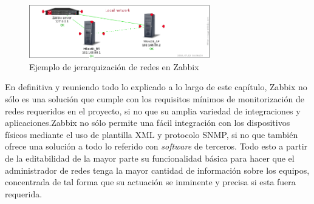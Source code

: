 \begin{figure}[H]
	\centering
	\includegraphics[width=0.7\textwidth]{img/zabbix_networks.png}
	\caption{Ejemplo de jerarquización de redes en Zabbix}
	\label{zabbixNetwork}
\end{figure}

En definitiva y reuniendo todo lo explicado a lo largo de este capítulo, Zabbix no sólo es una solución que cumple con los requisitos mínimos de monitorización de redes requeridos en el proyecto, si no que su amplia variedad de integraciones y aplicaciones.Zabbix no sólo permite una fácil integración con los dispositivos físicos mediante el uso de plantilla XML y protocolo SNMP, si no que también ofrece una solución a todo lo referido con \textit{software} de terceros. Todo esto a partir de la editabilidad de la mayor parte su funcionalidad básica para hacer que el administrador de redes tenga la mayor cantidad de información sobre los equipos, concentrada de tal forma que su actuación se inminente y precisa si esta fuera requerida.